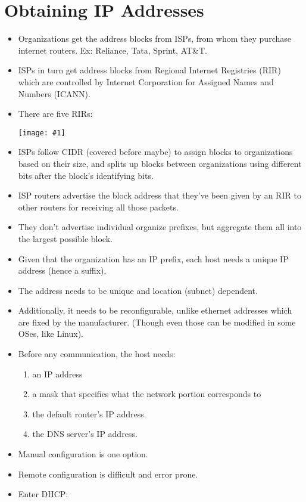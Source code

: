 \documentclass{report}
\makeatletter
\def\maxwidth#1{\ifdim\Gin@nat@width>#1 #1\else\Gin@nat@width\fi}
\newcommand{\mygraphic}[1]{
\begin{center}
    \texttt{[image: \#1]}
\end{center}
}
\makeatother
\begin{document}
\section{Obtaining IP Addresses}
\begin{itemize}
\item Organizations get the address blocks from ISPs, from whom they purchase internet routers. Ex: Reliance, Tata, Sprint, AT\&T.
\item ISPs in turn get address blocks from Regional Internet Registries (RIR) which are controlled by Internet Corporation for Assigned Names and Numbers (ICANN).
\item There are five RIRs:
\mygraphic{rsrc/rirs.png}
\item ISPs follow CIDR (covered before maybe) to assign blocks to organizations based on their size, and splits up blocks between organizations using different bits after the block's identifying bits.
\item ISP routers advertise the block address that they've been given by an RIR to other routers for receiving all those packets.
\item They don't advertise individual organize prefixes, but aggregate them all into the largest possible block.
\item Given that the organization has an IP prefix, each host needs a unique IP address (hence a suffix).
\item The address needs to be unique and location (subnet) dependent.
\item Additionally, it needs to be reconfigurable, unlike ethernet addresses which are fixed by the manufacturer. (Though even those can be modified in some OSes, like Linux).
\item Before any communication, the host needs:
\begin{enumerate}
    \item an IP address
    \item a mask that specifies what the network portion corresponds to
    \item the default router's IP address.
    \item the DNS server's IP address.
\end{enumerate} 
\item Manual configuration is one option.
\item Remote configuration is difficult and error prone.
\item Enter DHCP:
\end{itemize}
\end{document}
